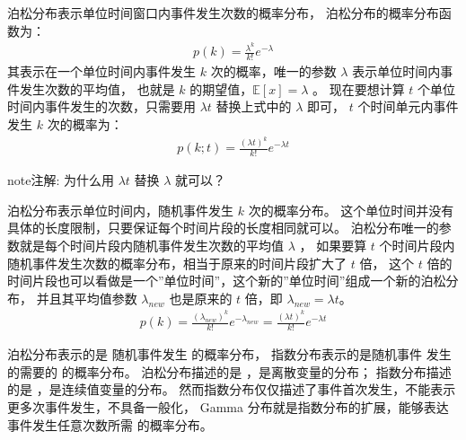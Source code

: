 \documentclass[letterpaper,10pt,english]{sphinxmanual}
\begin{document}
泊松分布表示单位时间窗口内事件发生次数的概率分布，
泊松分布的概率分布函数为：
\begin{equation}\label{equation:gamma模型/content:gamma模型/content:0}
\begin{split}p(k) = \frac{\lambda^k}{k!}  e^{-\lambda}\end{split}
\end{equation}
其表示在一个单位时间内事件发生 \(k\) 次的概率，唯一的参数 \(\lambda\) 表示单位时间内事件发生次数的平均值，
也就是 \(k\) 的期望值，\(\mathbb{E}[x]=\lambda\) 。
现在要想计算 \(t\) 个单位时间内事件发生的次数，只需要用 \(\lambda t\) 替换上式中的 \(\lambda\) 即可，
\(t\) 个时间单元内事件发生 \(k\) 次的概率为：
\begin{equation}\label{equation:gamma模型/content:gamma模型/content:1}
\begin{split}p(k;t) = \frac{(\lambda t)^k}{k!}  e^{-\lambda t}\end{split}
\end{equation}
\begin{sphinxadmonition}{note}{注解:}
为什么用 \(\lambda t\) 替换 \(\lambda\) 就可以？

泊松分布表示单位时间内，随机事件发生 \(k\) 次的概率分布。
这个单位时间并没有具体的长度限制，只要保证每个时间片段的长度相同就可以。
泊松分布唯一的参数就是每个时间片段内随机事件发生次数的平均值 \(\lambda\) ，
如果要算 \(t\) 个时间片段内随机事件发生次数的概率分布，相当于原来的时间片段扩大了 \(t\) 倍，
这个 \(t\) 倍的时间片段也可以看做是一个”单位时间”，这个新的”单位时间”组成一个新的泊松分布，
并且其平均值参数 \(\lambda_{new}\) 也是原来的 \(t\) 倍，即 \(\lambda_{new} =  \lambda t\)。
\begin{equation}\label{equation:gamma模型/content:gamma模型/content:2}
\begin{split}p(k) = \frac{(\lambda_{new})^k}{k!}  e^{-\lambda_{new}} = \frac{(\lambda t)^k}{k!}  e^{-\lambda t}\end{split}
\end{equation}\end{sphinxadmonition}

泊松分布表示的是  随机事件发生  的概率分布，
指数分布表示的是随机事件  发生的需要的  的概率分布。
泊松分布描述的是 ，是离散变量的分布；
指数分布描述的是  ，是连续值变量的分布。
然而指数分布仅仅描述了事件首次发生，不能表示更多次事件发生，不具备一般化，
Gamma 分布就是指数分布的扩展，能够表达事件发生任意次数所需  的概率分布。
\end{document}
